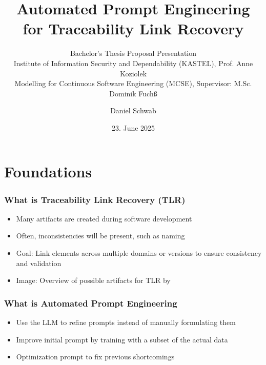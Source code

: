 \documentclass{sdqbeamer}
\title[Automated Prompt Engineering for Traceability Link Recovery]{Automated Prompt Engineering for Traceability Link Recovery}
\subtitle{Bachelor's Thesis Proposal Presentation \\
Institute of Information Security and Dependability (KASTEL), Prof. Anne Koziolek \\
Modelling for Continuous Software Engineering (MCSE), Supervisor:  M.Sc. Dominik Fuchß}
\author{Daniel Schwab}
\date[23.\,06.\,2025]{23. June 2025}
\begin{document}
\begin{frame}[title white horizontal, picture=images/palladio_bauplan, kitlogo=white]
\titlepage
\end{frame}



\section{Foundations}


\begin{frame}[picture 50 vertical, picture=images/artifact_overview_Fuchß.png]
\frametitle{What is Traceability Link Recovery (TLR)}
	\begin{itemize}
		\item Many artifacts are created during software development
            \item Often, inconsistencies will be present, such as naming
            \item Goal: Link elements across multiple domains or versions to ensure consistency and validation
            \item Image: Overview of possible artifacts for TLR by \cite{fuchss2025LiSSAGeneric}
	\end{itemize}
\end{frame}


\begin{frame}[picture 66 vertical, picture=images/iterative_core_loop.pdf]
\frametitle{What is Automated Prompt Engineering}
    \begin{itemize}
        \item Use the LLM to refine prompts instead of manually formulating them
        \item Improve initial prompt by training with a subset of the actual data
        \item Optimization prompt to fix previous shortcomings
    \end{itemize} 
\end{frame}

\begin{comment}
\begin{frame}
\frametitle{The LiSSA Framework}
    \begin{figure}
        \centering
        \texttt{[image: images/LiSSA\_pipeline\_Fuchß.png]}
        \caption{LiSSA pipeline by \cite{fuchss2025LiSSAGeneric}}
        \label{fig:enter-label}
    \end{figure}
    \begin{itemize}
        \item This work will add to the prompting step of the LiSSA framework
    \end{itemize}
    
\end{frame}
\end{comment}
\end{document}
